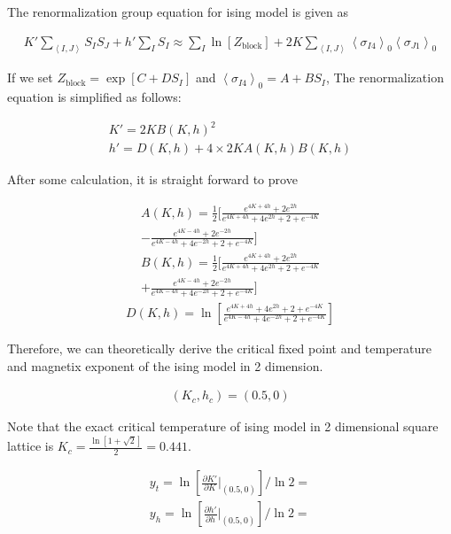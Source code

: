 \documentclass[%
 reprint,
 amsmath,amssymb,
 aps,
]{revtex4-2}
\begin{document}
The renormalization group equation for ising model is given as

\begin{widetext}
\begin{gather}
K'\sum_{\left<I,J\right>}S_{I}S_{J}+h'\sum_{I}S_{I} \approx 
\sum_{I} \ln\left[Z_{\text{block}}\right] + 2K \sum_{\left<I,J\right>}
\left<\sigma_{I4}\right>_{0}\left<\sigma_{J1}\right>_{0}
\end{gather}
\end{widetext}

If we set $Z_{\text{block}} = \exp[C+DS_{I}]$ and $\left<\sigma_{I4}\right>_{0} = A + BS_{I}$,
The renormalization equation is simplified as follows:

\begin{gather}
K' = 2KB(K,h)^{2} \\
h' = D(K,h) + 4 \times 2KA(K,h)B(K,h)
\end{gather}

After some calculation, it is straight forward to prove

\begin{multline}
A(K,h) = \frac{1}{2} \bigg[\frac{e^{4K+4h}+2e^{2h}}{e^{4K+4h}+4e^{2h}+2+e^{-4K}} \\
- \frac{e^{4K-4h}+2e^{-2h}}{e^{4K-4h}+4e^{-2h}+2+e^{-4K}}\bigg]
\end{multline}
\begin{multline}
B(K,h) = \frac{1}{2} \bigg[\frac{e^{4K+4h}+2e^{2h}}{e^{4K+4h}+4e^{2h}+2+e^{-4K}} \\
+ \frac{e^{4K-4h}+2e^{-2h}}{e^{4K-4h}+4e^{-2h}+2+e^{-4K}}\bigg]
\end{multline}
\begin{gather}
D(K,h) = \ln\left[\frac{e^{4K+4h}+4e^{2h}+2+e^{-4K}}{e^{4K-4h}+4e^{-2h}+2+e^{-4K}}\right]
\end{gather}

Therefore, we can theoretically derive the critical fixed point and temperature and magnetix
exponent of the ising model in 2 dimension.

\begin{gather}
\left(K_{c}, h_{c}\right) = (0.5, 0)
\end{gather}

Note that the exact critical temperature of ising model in 2 dimensional square lattice is
$K_{c} = \frac{\ln\left[1+\sqrt2\right]}{2} = 0.441$.

\begin{gather}
y_{t} = \ln\left[\frac{\partial K'}{\partial K} \bigg|_{(0.5,0)}\right] / \ln2 =  \\
y_{h} = \ln\left[\frac{\partial h'}{\partial h} \bigg|_{(0.5,0)}\right] / \ln2 = 
\end{gather}
\end{document}
